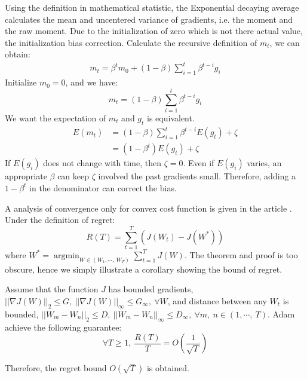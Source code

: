 Using the definition in mathematical statistic, the Exponential decaying average
calculates the mean and uncentered variance of gradients, i.e. the 
moment and the  raw moment. Due to the initialization of zero which
is not there actual value, the initialization bias correction. Calculate the
recursive definition of $ m_t $, we can obtain:
\begin{align}
    m_t = \beta^tm_0 + (1-\beta)\sum _{i=1}^t\beta^{t-i}g_i
\end{align}
Initialize $ m_0 = 0 $, and we have:
\begin{equation}
    m_t = (1-\beta)\sum _{i=1}^t\beta^{t-i}g_i
\end{equation}
We want the expectation of $ m_t $ and $ g_t $ is equivalent.
\begin{align}
    E(m_t) & = (1-\beta)\sum _{i=1}^t\beta^{t-i}E(g_t) + \zeta \\
    & = (1-\beta^t)E(g_t) + \zeta
\end{align}
If $ E(g_i) $ does not change with time, then $ \zeta=0 $. Even if $ E(g_i) $
varies, an appropriate $ \beta $ can keep $ \zeta $ involved the past gradients
small. Therefore, adding a $ 1-\beta^t $ in the denominator can correct the bias.
\par A analysis of convergence only for convex cost function is given in the 
article \parencite{kingma2014adam}. Under the definition of regret:
\begin{equation}
    R(T) = \sum _{t=1}^T(J(W_t) - J(W^*)) 
\end{equation}
where $ W^* = \mathop{\arg\min}_{W\in (W_1,\cdots,\ W_T)}\sum _{t=1}^TJ(W) $.
The theorem and proof is too obscure, hence we simply illustrate a corollary
showing the bound of regret.
\begin{cor}
    Assume that the function $J$ has bounded gradients, 
    $ ||\nabla J(W)||_2 \leq G,\ ||\nabla J(W)||_\infty \leq G_\infty,
    \ \forall W $, and distance between any $ W_t $ is bounded, 
    $ ||W_m - W_n||_2 \leq D,\ ||W_m - W_n||_\infty \leq D_\infty,\
    \forall m,\ n \in (1,\cdots,\ T) $. Adam achieve the following 
    guarantee:
    \begin{equation}
        \forall T \geq 1,\ \frac{R(T)}{T} = O(\frac{1}{\sqrt{T}})
    \end{equation} 
\end{cor}
Therefore, the regret bound $ O(\sqrt{T}) $ is obtained.

